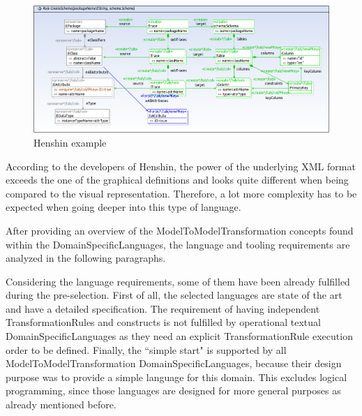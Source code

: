 \begin{figure}[htb]
	\centering
	\includegraphics[scale=0.40,natwidth=1023,natheight=440]{Images/HenshinExample.png} 
	\caption{Henshin example}
	\label{figHenshinExample}
\end{figure}		

According to the developers of Henshin, the power of the underlying XML format exceeds the one of the graphical definitions and looks quite different when being compared to the visual representation. Therefore, a lot more complexity has to be expected when going deeper into this type of language.

After providing an overview of the \gls{ModelToModelTransformation} concepts found within the \glspl{DomainSpecificLanguage}, the language and tooling requirements are analyzed in the following paragraphs.

Considering the language requirements, some of them have been already fulfilled during the pre-selection. First of all, the selected languages are state of the art and have a detailed specification. The requirement of having independent \glspl{TransformationRule} and constructs is not fulfilled by operational textual \glspl{DomainSpecificLanguage} as they need an explicit \gls{TransformationRule} execution order to be defined. Finally, the ``simple start" is supported by all \gls{ModelToModelTransformation} \glspl{DomainSpecificLanguage}, because their design purpose was to provide a simple language for this domain. This excludes logical programming, since those languages are designed for more general purposes as already mentioned before.


